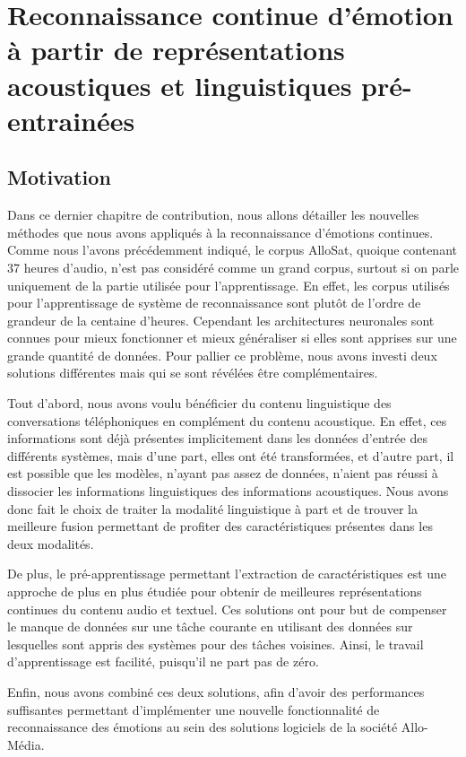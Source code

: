 \chapter{Reconnaissance continue d’émotion à partir de représentations acoustiques et linguistiques pré-entrainées}
\label{chapitre6}

\section{Motivation}

Dans ce dernier chapitre de contribution, nous allons détailler les nouvelles méthodes que nous avons appliqués à la reconnaissance d'émotions continues. Comme nous l'avons précédemment indiqué, le corpus AlloSat, quoique contenant 37 heures d'audio, n'est pas considéré comme un grand corpus, surtout si on parle uniquement de la partie utilisée pour l'apprentissage. En effet, les corpus utilisés pour l'apprentissage de système de reconnaissance sont plutôt de l'ordre de grandeur de la centaine d'heures. Cependant les architectures neuronales sont connues pour mieux fonctionner et mieux généraliser si elles sont apprises sur une grande quantité de données. Pour pallier ce problème, nous avons investi deux solutions différentes mais qui se sont révélées être complémentaires.

Tout d'abord, nous avons voulu bénéficier du contenu linguistique des conversations téléphoniques en complément du contenu acoustique.
En effet, ces informations sont déjà présentes implicitement dans les données d'entrée des différents systèmes, mais d'une part, elles ont été transformées, et d'autre part, il est possible que les modèles, n'ayant pas assez de données, n'aient pas réussi à dissocier les informations linguistiques des informations acoustiques. Nous avons donc fait le choix de traiter la modalité linguistique à part et de trouver la meilleure fusion permettant de profiter des caractéristiques présentes dans les deux modalités.

De plus, le pré-apprentissage permettant l'extraction de caractéristiques est une approche de plus en plus étudiée pour obtenir de meilleures représentations continues du contenu audio et textuel. Ces solutions ont pour but de compenser le manque de données sur une tâche courante en utilisant des données sur lesquelles sont appris des systèmes pour des tâches voisines. Ainsi, le travail d'apprentissage est facilité, puisqu'il ne part pas de zéro.

Enfin, nous avons combiné ces deux solutions, afin d'avoir des performances suffisantes permettant d'implémenter une nouvelle fonctionnalité de reconnaissance des émotions au sein des solutions logiciels de la société Allo-Média.

